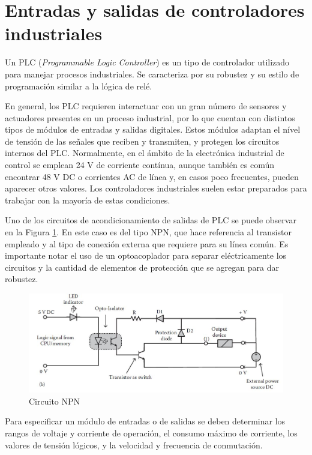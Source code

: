 \section{Entradas y salidas de controladores industriales}
\label{io_industriales}

Un PLC (\textit{Programmable Logic Controller}) es un tipo de controlador utilizado para manejar procesos industriales. Se caracteriza por su robustez y su estilo de programación similar a la lógica de relé.

En general, los PLC requieren interactuar con un gran número de sensores y actuadores presentes en un proceso industrial, por lo que cuentan con distintos tipos de módulos de entradas y salidas digitales. Estos módulos adaptan el nível de tensión de las señales que reciben y transmiten, y protegen los circuitos internos del PLC\citep{Introduction_Industrial_Automation}. Normalmente, en el ámbito de la electrónica industrial de control se emplean 24 V de corriente contínua, aunque también es común encontrar 48 V DC o corrientes AC de línea y, en casos poco frecuentes, pueden aparecer otros valores. Los controladores industriales suelen estar preparados para trabajar con la mayoría de estas condiciones.

Uno de los circuitos de acondicionamiento de salidas de PLC se puede observar en la Figura \ref{fig:Circuito_NPN}. En este caso es del tipo NPN, que hace referencia al transistor empleado y al tipo de conexión externa que requiere para su línea común. Es importante notar el uso de un optoacoplador para separar eléctricamente los circuitos y la cantidad de elementos de protección que se agregan para dar robustez.

\begin{figure}[htbp]
	\centering
	\includegraphics[scale=.5]{./Figures/Circuito_NPN.JPG}
	\caption{Circuito NPN\citep{Introduction_Industrial_Automation}}
	\label{fig:Circuito_NPN}
\end{figure}

Para especificar un módulo de entradas o de salidas se deben determinar los rangos de voltaje y corriente de operación, el consumo máximo de corriente, los valores de tensión lógicos, y la velocidad y frecuencia de conmutación.

